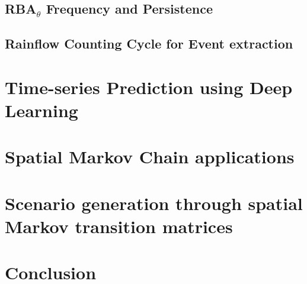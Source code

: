 \documentclass[11pt]{article}
\begin{document}






\subsection{RBA$_\theta$ Frequency and Persistence} \label{ss:persistence}


\subsection{Rainflow Counting Cycle for Event extraction} \label{ssec:rainflow}


\section{Time-series Prediction using Deep Learning }
\label{ssec:lstm}



\section{Spatial Markov Chain applications} \label{sec:markov}


\section{Scenario generation through spatial Markov transition matrices}
\label{sec:scen}


%

\section{Conclusion} \label{conclusion}






\end{document}
